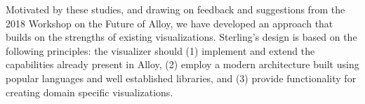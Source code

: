 \documentclass[runningheads]{llncs}
\begin{document}


Motivated by these studies, and drawing on feedback and suggestions from the 2018 Workshop on the Future of Alloy, we have developed an approach that builds on the strengths of existing visualizations.
Sterling's design is based on the following principles: the visualizer should (1) implement and extend the capabilities already present in Alloy, (2) employ a modern architecture built using popular languages and well established libraries, and (3) provide functionality for creating domain specific visualizations.

\end{document}

